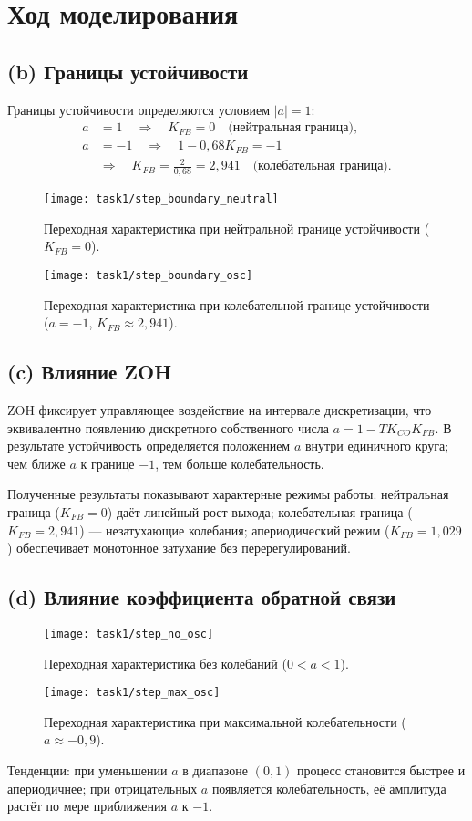 \section{Ход моделирования}


\subsection*{(b) Границы устойчивости}
Границы устойчивости определяются условием \(|a| = 1\):
\begin{align}
  a &= 1 \quad \Rightarrow \quad K_{FB} = 0 \quad \text{(нейтральная граница)}, \\
  a &= -1 \quad \Rightarrow \quad 1 - 0{,}68 K_{FB} = -1 \\
  &\Rightarrow \quad K_{FB} = \frac{2}{0{,}68} = 2{,}941 \quad \text{(колебательная граница)}.
\end{align}
\begin{figure}[H]
  \centering
  \texttt{[image: task1/step\_boundary\_neutral]}
  \caption{Переходная характеристика при нейтральной границе устойчивости (\(K_{FB}=0\)).}
  \label{fig:task1_neutral}
\end{figure}
\begin{figure}[H]
  \centering
  \texttt{[image: task1/step\_boundary\_osc]}
  \caption{Переходная характеристика при колебательной границе устойчивости (\(a=-1\), \(K_{FB}\approx2{,}941\)).}
  \label{fig:task1_osc}
\end{figure}

\subsection*{(c) Влияние ZOH}
ZOH фиксирует управляющее воздействие на интервале дискретизации, что эквивалентно появлению дискретного собственного числа \(a=1-TK_{CO}K_{FB}\). В результате устойчивость определяется положением \(a\) внутри единичного круга; чем ближе \(a\) к границе \(-1\), тем больше колебательность.

Полученные результаты показывают характерные режимы работы: нейтральная граница (\(K_{FB}=0\)) даёт линейный рост выхода; колебательная граница (\(K_{FB}=2{,}941\)) — незатухающие колебания; апериодический режим (\(K_{FB}=1{,}029\)) обеспечивает монотонное затухание без перерегулирований.

\subsection*{(d) Влияние коэффициента обратной связи}
\begin{figure}[H]
  \centering
  \texttt{[image: task1/step\_no\_osc]}
  \caption{Переходная характеристика без колебаний (\(0<a<1\)).}
  \label{fig:task1_no_osc}
\end{figure}
\begin{figure}[H]
  \centering
  \texttt{[image: task1/step\_max\_osc]}
  \caption{Переходная характеристика при максимальной колебательности (\(a\approx-0{,}9\)).}
  \label{fig:task1_max_osc}
\end{figure}
Тенденции: при уменьшении \(a\) в диапазоне \((0,1)\) процесс становится быстрее и апериодичнее; при отрицательных \(a\) появляется колебательность, её амплитуда растёт по мере приближения \(a\) к \(-1\).

